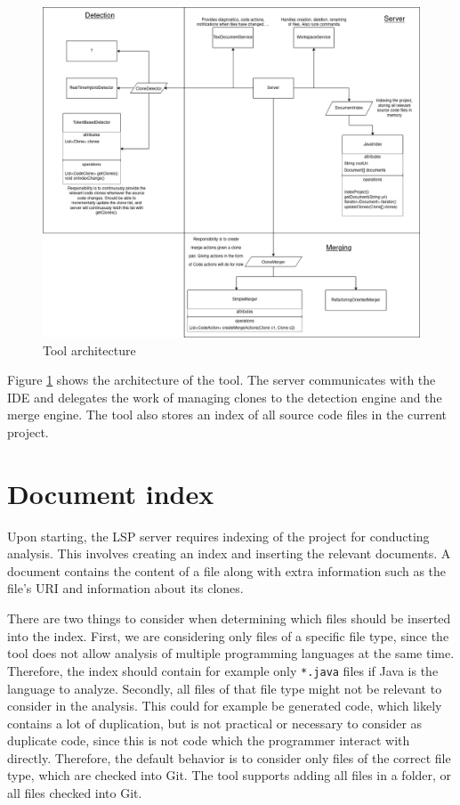 \begin{figure}
	\includegraphics[width=\textwidth]{images/ToolArchitecture.png}
	\caption{Tool architecture}
	\label{fig:architecture}
\end{figure}

Figure \ref{fig:architecture} shows the architecture of the tool. The server communicates
with the IDE and delegates the work of managing clones to the detection engine and the
merge engine. The tool also stores an index of all source code files in the current project.

\section{Document index}

Upon starting, the LSP server requires indexing of the project for conducting analysis.
This involves creating an index and inserting the relevant documents. A document contains the
content of a file along with extra information such as the file's URI and information
about its clones.

There are two things to consider when determining which files should be inserted into the
index. First, we are considering only files of a specific file type, since the tool does
not allow analysis of multiple programming languages at the same time. Therefore, the
index should contain for example only \verb|*.java| files if Java is the language to
analyze. Secondly, all files of that file type might not be relevant to consider in the
analysis. This could for example be generated code, which likely contains a lot of
duplication, but is not practical or necessary to consider as duplicate code, since this
is not code which the programmer interact with directly. Therefore, the default behavior
is to consider only files of the correct file type, which are checked into Git. The tool
supports adding all files in a folder, or all files checked into Git.

